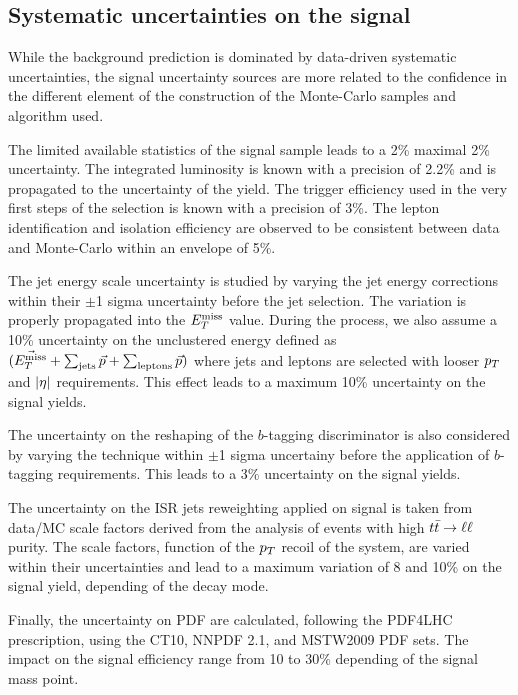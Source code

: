         \subsection{Systematic uncertainties on the signal}

        While the background prediction is dominated by data-driven systematic
        uncertainties, the signal uncertainty sources are more related to the
        confidence in the different element of the construction of the Monte-Carlo
        samples and algorithm used.

        The limited available statistics of the signal sample leads to a 2\% maximal
        2\% uncertainty. The integrated luminosity is known with a precision of 2.2\%
        and is propagated to the uncertainty of the yield. The trigger efficiency
        used in the very first steps of the selection is known with a precision of 3\%.
        The lepton identification and isolation efficiency are observed to be consistent
        between data and Monte-Carlo within an envelope of 5\%.

        The jet energy scale uncertainty is studied by varying the jet energy corrections
        within their $\pm$1 sigma uncertainty before the jet selection. The variation is
        properly propagated into the $E_T^\text{miss}$ value. During the process, we also assume a 
        10\% uncertainty on the unclustered energy defined as $(\vec{E_T^\text{miss}} + \sum_\text{jets}
        \vec{p} + \sum_\text{leptons} \vec{p})$ where jets and leptons are selected with looser
        $p_T$ and $\left| \eta \right|$ requirements. This effect leads to a maximum 10\% uncertainty on
        the signal yields.

        The uncertainty on the reshaping of the $b$-tagging discriminator is also considered
        by varying the technique within $\pm$1 sigma uncertainy before the application of
        $b$-tagging requirements. This leads to a 3\% uncertainty on the signal yields.

        The uncertainty on the ISR jets reweighting applied on signal is taken from data/MC
        scale factors derived from the analysis of events with high $t\bar{t} \rightarrow \ell \ell$ purity. The
        scale factors, function of the $p_T$ recoil of the system, are varied within their
        uncertainties and lead to a maximum variation of 8 and 10\% on the signal yield, depending
        of the decay mode.

        Finally, the uncertainty on PDF are calculated, following the PDF4LHC prescription,
        using the CT10, NNPDF 2.1, and MSTW2009 PDF sets.  The impact on the
        signal efficiency range from 10 to 30\% depending of the signal mass point. 

